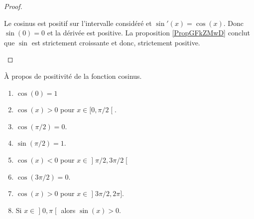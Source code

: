 \begin{proof}
\begin{enumerate}
		      Le cosinus est positif sur l'intervalle considéré et \( \sin'(x)=\cos(x)\). Donc \( \sin(0)=0\) et la dérivée est positive. La proposition \ref{PropGFkZMwD} conclut que \( \sin\) est strictement croissante et donc, strictement positive.
	\end{enumerate}
\end{proof}

\begin{lemma}      \label{LEMooFESYooBoiuol}
	À propos de positivité de la fonction cosinus.
	\begin{enumerate}
		\item       \label{ITEMooIXSDooJyCQyb}
		      \( \cos(0)=1\)
		\item       \label{ITEMooWJEVooGZykbO}
		      \( \cos(x)>0\) pour \( x\in\mathopen[ 0 , \pi/2 \mathclose[\).
		\item       \label{ITEMooANEPooLGmYtc}
		      \( \cos(\pi/2)=0\).
		\item       \label{ITEMooXXISooBycstN}
		      \( \sin(\pi/2)=1\).
		\item       \label{ITEMooRDWJooZXWyfv}
		      \( \cos(x)<0\) pour \( x\in \mathopen] \pi/2 , 3\pi/2 \mathclose[\)
		\item       \label{ITEMooFKPAooBNlvPU}
		      \( \cos(3\pi/2)=0\).
		\item       \label{ITEMooIDZGooBTDvDF}
		      \( \cos(x)>0\) pour \( x\in\mathopen] 3\pi/2 , 2\pi \mathclose]\).
		\item		\label{ITEMooBRVEooFhxohI}
		      Si \( x\in\mathopen] 0,\pi\mathclose[\) alors \( \sin(x)>0\).
	\end{enumerate}
\end{lemma}

